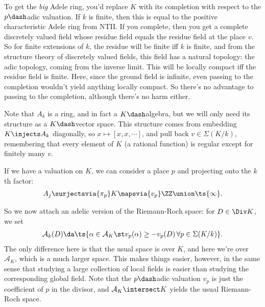 \begin{remark}

To get the \emph{big} Adele ring, you'd replace \(K\) with its
completion with respect to the \(p\dash\)adic valuation. If \(k\) is
finite, then this is equal to the positive characteristic Adele ring
from NTII. If you complete, then you get a complete discretely valued
field whose residue field equals the residue field at the place \(v\).
So for finite extensions of \(k\), the residue will be finite iff \(k\)
is finite, and from the structure theory of discretely valued fields,
this field has a natural topology: the adic topology, coming from the
inverse limit. This will be locally compact iff the residue field is
finite. Here, since the ground field is infinite, even passing to the
completion wouldn't yield anything locally compact. So there's no
advantage to passing to the completion, although there's no harm either.

\end{remark}

Note that \(A_k\) is a ring, and in fact a \(K\dash\)algebra, but we
will only need its structure as a \(K\dash\)vector space. This structure
comes from embedding \(K\injects A_k\) diagonally, so
\(x \mapsto [x, x, \cdots]\), and pull back \(v\in \Sigma(K/k)\),
remembering that every element of \(K\) (a rational function) is regular
except for finitely many \(v\).

If we have a valuation on \(K\), we can consider a place \(p\) and
projecting onto the \(k\)th factor:
\begin{align*}  
A_j \surjectsvia{\pi_p} K \mapsvia{v_p} \ZZ \union \ts{\infty}
.\end{align*}

So we now attach an adelic version of the Riemann-Roch space: for
\(D\in \Div K\), we set
\begin{align*}  
\mathcal{A}_k(D) \da \ts{ \alpha \in \mathcal{A}_K \st v_p(\alpha) \geq -v_p(D) \, \forall p \in \Sigma(K/k)}
.\end{align*} The only difference here is that the usual space is over
\(K\), and here we're over \(\mathcal{A}_K\), which is a much larger
space. This makes things easier, however, in the same sense that
studying a large collection of local fields is easier than studying the
corresponding global field. Note that the \(p\dash\)adic valuation
\(v_p\) is just the coefficient of \(p\) in the divisor, and
\(\mathcal{A}_K \intersect K\) yields the usual Riemann-Roch space.

